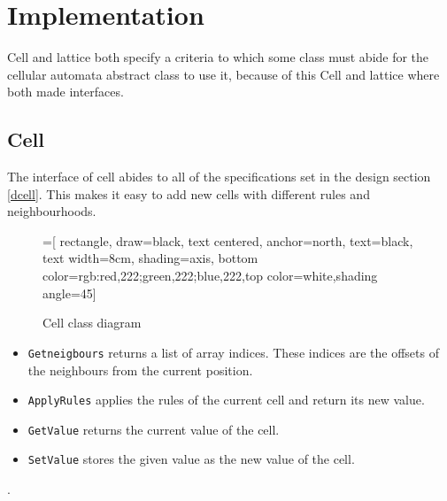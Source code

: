 \documentclass[a4paper, 10pt]{article}
\begin{document}
\section{Implementation}
\label{impl}
Cell and lattice both specify a criteria to which some class must abide for the cellular automata abstract class to use it, because of this Cell and lattice where both made interfaces.
\subsection{Cell}
\label{icell}
The interface of cell abides to all of the specifications set in the design section \ref{dcell}. This makes it easy to add new cells with different rules and neighbourhoods.
\begin{figure}[!ht]
\center
{}=[
    rectangle,
    draw=black,
    text centered,
    anchor=north,
    text=black,
    text width=8cm,
    shading=axis,
    bottom color={rgb:red,222;green,222;blue,222},top color=white,shading angle=45]

\caption{Cell class diagram}
\end{figure}
\begin{itemize}
\item \texttt{Getneigbours} returns a list of array indices. These indices are the offsets of the neighbours from the current position.
\item \texttt{ApplyRules} applies the rules of the current cell and return its new value.
\item \texttt{GetValue} returns the current value of the cell.
\item \texttt{SetValue} stores the given value as the new value of the cell.
\end{itemize}
.
\end{document}
